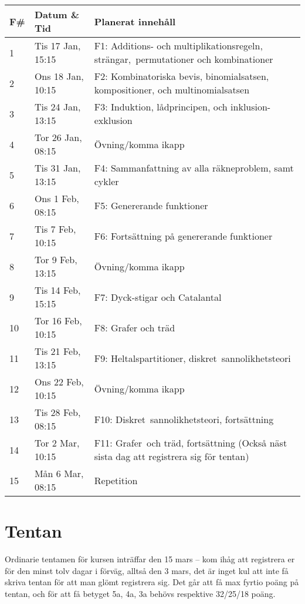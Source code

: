 \documentclass{tufte-handout}
\begin{document}
\begin{table}[h]
\begin{tabularx}{\textwidth}{llX}
F\# & Datum \& Tid      & Planerat innehåll \\ 
\midrule
1            & Tis 17 Jan, 15:15 & F1: Additions- och multiplikationsregeln, strängar,\, permutationer och kombinationer\\
2            & Ons 18 Jan, 10:15 & F2: Kombinatoriska bevis, binomialsatsen, kompositioner, och multinomialsatsen\\
3            & Tis 24 Jan, 13:15 & F3: Induktion, lådprincipen, och inklusion-exklusion\\
4            & Tor 26 Jan, 08:15 & Övning/komma ikapp\\
5	      & Tis 31 Jan, 13:15 & F4: Sammanfattning av alla räkneproblem, samt cykler\\
6            & Ons 1 Feb, 08:15 & F5: Genererande funktioner\\
7            & Tis 7 Feb, 10:15  & F6: Fortsättning på genererande funktioner\\
8            & Tor 9 Feb, 13:15  & Övning/komma ikapp\\
9            & Tis 14 Feb, 15:15 & F7: Dyck-stigar och Catalantal\\
10            & Tor 16 Feb, 10:15 & F8: Grafer och träd\\
11            & Tis 21 Feb, 13:15 & F9: Heltalspartitioner, diskret\, sannolikhetsteori\\
12           & Ons 22 Feb, 10:15 & Övning/komma ikapp\\
13           & Tis 28 Feb, 08:15 & F10: Diskret\, sannolikhetsteori, fortsättning\\
14           & Tor 2 Mar, 10:15  & F11: Grafer\, och träd, fortsättning (Också näst sista dag att registrera sig för tentan)\\
15           & Mån 6 Mar, 08:15 & Repetition
\end{tabularx}
\end{table}

\section{Tentan}

Ordinarie tentamen för kursen inträffar den 15 mars -- kom ihåg att registrera er för den minst tolv dagar i förväg, alltså den 3 mars, det är inget kul att inte få skriva tentan för att man glömt registrera sig. Det går att få max fyrtio poäng på tentan, och för att få betyget 5a, 4a, 3a behövs respektive 32/25/18 poäng.
\end{document}
